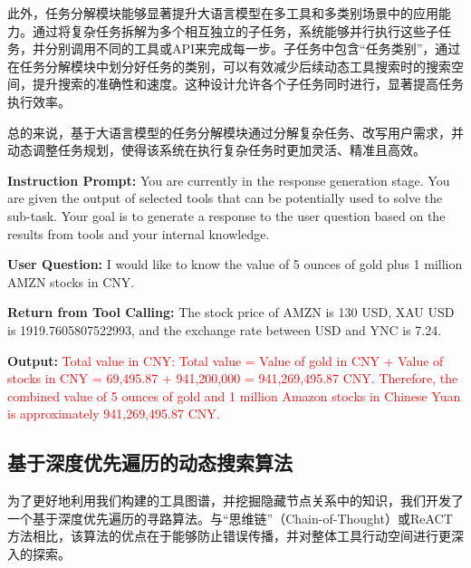 此外，任务分解模块能够显著提升大语言模型在多工具和多类别场景中的应用能力。通过将复杂任务拆解为多个相互独立的子任务，系统能够并行执行这些子任务，并分别调用不同的工具或API来完成每一步。子任务中包含“任务类别”，通过在任务分解模块中划分好任务的类别，可以有效减少后续动态工具搜索时的搜索空间，提升搜索的准确性和速度。这种设计允许各个子任务同时进行，显著提高任务执行效率。

总的来说，基于大语言模型的任务分解模块通过分解复杂任务、改写用户需求，并动态调整任务规划，使得该系统在执行复杂任务时更加灵活、精准且高效。



\begin{center}
\begin{tcolorbox}[colback=bgcolor, colframe=black, width=0.8\textwidth, boxrule=0.5mm, 
coltitle=white, colbacktitle=titlecolor, title=An Example for Response Generation with GPT-4]


\textbf{Instruction Prompt:} You are currently in the response generation stage. You are given the output of selected tools that can be potentially used to solve the sub-task. Your goal is to generate a response to the user question based on the results from tools and your internal knowledge.

\textbf{User Question:} I would like to know the value of 5 ounces of gold plus 1 million AMZN stocks in CNY.

\textbf{Return from Tool Calling:} The stock price of AMZN is 130 USD, XAU USD is 1919.7605807522993, and the exchange rate between USD and YNC is 7.24.

\textbf{Output:} \textcolor{red}{Total value in CNY: Total value = Value of gold in CNY + Value of stocks in CNY = 69,495.87 + 941,200,000 = 941,269,495.87 CNY. Therefore, the combined value of 5 ounces of gold and 1 million Amazon stocks in Chinese Yuan is approximately 941,269,495.87 CNY.}

\end{tcolorbox}

\end{center}


\subsection{基于深度优先遍历的动态搜索算法}

为了更好地利用我们构建的工具图谱，并挖掘隐藏节点关系中的知识，我们开发了一个基于深度优先遍历的寻路算法。与“思维链”（Chain-of-Thought）或ReACT方法相比，该算法的优点在于能够防止错误传播，并对整体工具行动空间进行更深入的探索。

